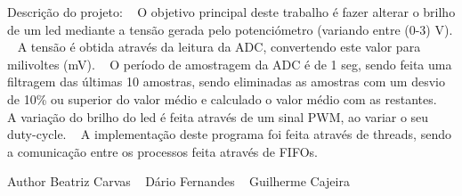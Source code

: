 Descrição do projeto\+: ~\newline
O objetivo principal deste trabalho é fazer alterar o brilho de um led mediante a tensão gerada pelo potenciómetro (variando entre (0-\/3) V). ~\newline
A tensão é obtida através da leitura da A\+DC, convertendo este valor para milivoltes (mV). ~\newline
O período de amostragem da A\+DC é de 1 seg, sendo feita uma filtragem das últimas 10 amostras, sendo eliminadas as amostras com um desvio de 10\% ou superior do valor médio e calculado o valor médio com as restantes. ~\newline
A variação do brilho do led é feita através de um sinal P\+WM, ao variar o seu duty-\/cycle. ~\newline
A implementação deste programa foi feita através de threads, sendo a comunicação entre os processos feita através de F\+I\+F\+Os.\begin{DoxyAuthor}{Author}
Beatriz Carvas ~\newline
 Dário Fernandes ~\newline
 Guilherme Cajeira 
\end{DoxyAuthor}
